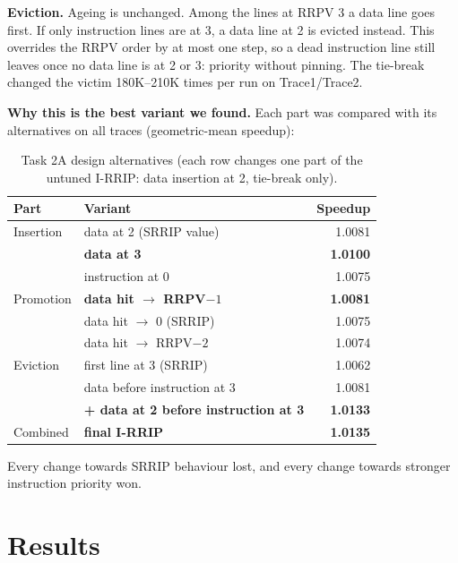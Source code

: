 \documentclass[12pt]{report}
\begin{document}
\textbf{Eviction.} Ageing is unchanged. Among the lines at RRPV 3 a data line
goes first. If only instruction lines are at 3, a data line at 2 is evicted
instead. This overrides the RRPV order by at most one step, so a dead
instruction line still leaves once no data line is at 2 or 3: priority without
pinning. The tie-break changed the victim 180K--210K times per run on
Trace1/Trace2.

\textbf{Why this is the best variant we found.} Each part was compared with
its alternatives on all traces (geometric-mean speedup):

\begin{table}[H]\centering
\begin{tabular}{l l r}
\toprule
Part & Variant & Speedup\\
\midrule
Insertion & data at 2 (SRRIP value) & 1.0081 \\
          & \textbf{data at 3} & \textbf{1.0100} \\
          & instruction at 0 & 1.0075 \\
Promotion & \textbf{data hit $\to$ RRPV$-1$} & \textbf{1.0081} \\
          & data hit $\to$ 0 (SRRIP) & 1.0075 \\
          & data hit $\to$ RRPV$-2$ & 1.0074 \\
Eviction  & first line at 3 (SRRIP) & 1.0062 \\
          & data before instruction at 3 & 1.0081 \\
          & \textbf{+ data at 2 before instruction at 3} & \textbf{1.0133} \\
\midrule
Combined  & \textbf{final I-RRIP} & \textbf{1.0135} \\
\bottomrule
\end{tabular}
\caption{Task 2A design alternatives (each row changes one part of the
untuned I-RRIP: data insertion at 2, tie-break only).}
\end{table}
Every change towards SRRIP behaviour lost, and every change towards stronger
instruction priority won.

\section{Results}
\end{document}

